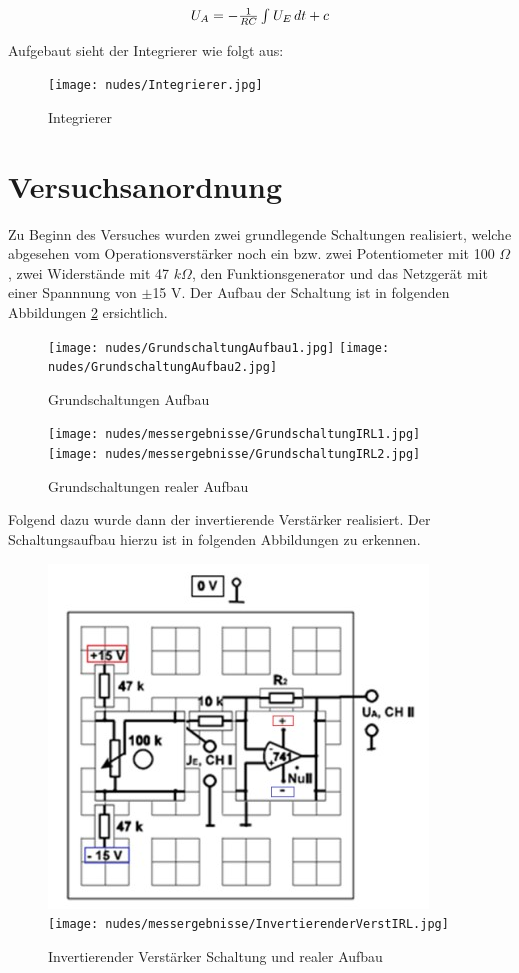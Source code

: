 \documentclass[12pt,a4paper,twoside]{article}
\begin{document}
\begin{equation}
    \label{eq:IntegriererAusgang}
    \centerline{$U_{A}=-\frac{1}{RC} \int_{}^{} U_{E} \,dt + c $}
\end{equation}

\noindent
Aufgebaut sieht der Integrierer wie folgt aus:

\begin{figure}[H]
    \centering
    \texttt{[image: nudes/Integrierer.jpg]}
    \caption{Integrierer \cite{teachcenter2}}
    \label{fig:Integrierer}
\end{figure}


\section{Versuchsanordnung} %

Zu Beginn des Versuches wurden zwei grundlegende Schaltungen realisiert, welche abgesehen vom Operationsverstärker noch ein bzw. zwei Potentiometer mit 100 $\Omega$, zwei Widerstände mit 47 $k \Omega$, den Funktionsgenerator und das Netzgerät mit einer Spannnung von $\pm$15 V. Der Aufbau der Schaltung ist in folgenden Abbildungen \ref{fig:GrundschaltungenAufbau} ersichtlich.

\begin{figure}[H]
    \centering
    \texttt{[image: nudes/GrundschaltungAufbau1.jpg]}
    \texttt{[image: nudes/GrundschaltungAufbau2.jpg]}
    \caption{Grundschaltungen Aufbau \cite{teachcenter2}}
    \label{fig:GrundschaltungenAufbau}
\end{figure}

\begin{figure}[H]
    \centering
    \texttt{[image: nudes/messergebnisse/GrundschaltungIRL1.jpg]}
    \texttt{[image: nudes/messergebnisse/GrundschaltungIRL2.jpg]}
    \caption{Grundschaltungen realer Aufbau}
    \label{fig:GrundschaltungenAufbauIRL}
\end{figure}

\noindent
Folgend dazu wurde dann der invertierende Verstärker realisiert. Der Schaltungsaufbau hierzu ist in folgenden Abbildungen zu erkennen.

\begin{figure}[H]
    \centering
    \includegraphics[width=0.4\linewidth]{nudes/InvertierenderVerstärkerSchaltungAufbau.jpg}
    \texttt{[image: nudes/messergebnisse/InvertierenderVerstIRL.jpg]}
    \caption{Invertierender Verstärker Schaltung und realer Aufbau \cite{teachcenter2}}
    \label{fig:SchaltungInvertierenderVerstärker}
\end{figure}
\end{document}
